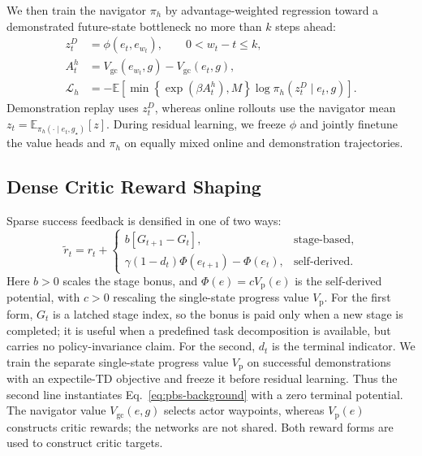 \documentclass[letterpaper]{article} %
\begin{document}
We then train the navigator $\pi_h$ by advantage-weighted regression toward a
demonstrated future-state bottleneck no more than $k$ steps ahead:
\begin{equation}
\begin{aligned}
z_t^D&=\phi(e_t,e_{w_t}),\qquad 0<w_t-t\leq k,\\
A_t^h&=V_{\mathrm{gc}}(e_{w_t},g)-V_{\mathrm{gc}}(e_t,g),\\
\mathcal L_h
&=-\mathbb E\!\left[
\min\!\left\{\exp(\beta A_t^h),M\right\}
\log\pi_h(z_t^D\mid e_t,g)\right].
\end{aligned}
\label{eq:navigator-awr}
\end{equation}
Demonstration replay uses $z_t^D$, whereas online rollouts use the navigator
mean $z_t=\mathbb E_{\pi_h(\cdot\mid e_t,g_\star)}[z]$. During residual
learning, we freeze $\phi$ and jointly finetune the value heads and $\pi_h$
on equally mixed online and demonstration trajectories.

\subsection{Dense Critic Reward Shaping}
\label{sec:pot}
Sparse success feedback is densified in one of two ways:
\begin{equation}
\widetilde r_t
=r_t+
\begin{cases}
 b[G_{t+1}-G_t], & \text{stage-based},\\
 \gamma(1-d_t)\Phi(e_{t+1})-\Phi(e_t),
 & \text{self-derived}.
\end{cases}
\label{eq:shore-dense-reward}
\end{equation}
Here $b>0$ scales the stage bonus, and $\Phi(e)=cV_{\mathrm p}(e)$ is the
self-derived potential, with $c>0$ rescaling the single-state progress value
$V_{\mathrm p}$. For the first form, $G_t$ is a latched stage
index, so the bonus is paid only when a new stage is completed; it is useful
when a predefined task decomposition is available, but carries no
policy-invariance claim. For the second,
$d_t$ is the terminal indicator. We train the
separate single-state progress value $V_{\mathrm p}$ on successful
demonstrations with an expectile-TD objective and freeze it before residual
learning. Thus the second line instantiates Eq.~\eqref{eq:pbs-background} with
a zero terminal potential. The navigator value
$V_{\mathrm{gc}}(e,g)$ selects actor waypoints, whereas $V_{\mathrm p}(e)$
constructs critic rewards; the networks are not shared. Both reward forms are
used to construct critic targets.
\end{document}
